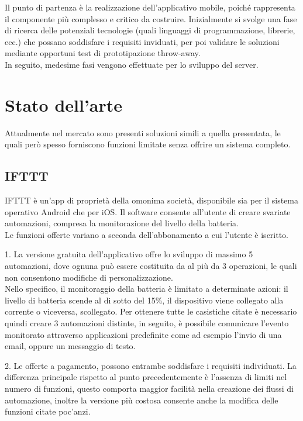 \documentclass[target=bach]{thud}
\begin{document}
    Il punto di partenza è la realizzazione dell'applicativo mobile, poiché rappresenta il componente più complesso e critico da costruire. Inizialmente si svolge una fase di ricerca delle potenziali tecnologie (quali linguaggi di programmazione, librerie, ecc.) che possano soddisfare i requisiti inviduati, per poi validare le soluzioni mediante opportuni test di prototipazione throw-away. \\

    In seguito, medesime fasi vengono effettuate per lo sviluppo del server.\\


\chapter{Stato dell'arte}

    Attualmente nel mercato sono presenti soluzioni simili a quella presentata, le quali però spesso forniscono funzioni limitate senza offrire un sistema completo.

    \section{IFTTT}

    IFTTT è un'app di proprietà della omonima società, disponibile sia per il sistema operativo Android che per iOS.
    Il software consente all'utente di creare svariate automazioni, compresa la monitorazione del livello della batteria.\\
    Le funzioni offerte variano a seconda dell'abbonamento a cui l'utente è iscritto.

    1. La versione gratuita dell'applicativo offre lo sviluppo di massimo 5 automazioni, dove ognuna può essere costituita da al più da 3 operazioni, le quali non consentono modifiche di personalizzazione.\\
    Nello specifico, il monitoraggio della batteria è limitato a determinate azioni: il livello di batteria scende al di sotto del 15\%, il dispositivo viene collegato alla corrente o viceversa, scollegato.
    Per ottenere tutte le casistiche citate è necessario quindi creare 3 automazioni distinte, in seguito, è possibile comunicare l'evento monitorato attraverso applicazioni predefinite come ad esempio l'invio di una email, oppure un messaggio di testo.

    2. Le offerte a pagamento, possono entrambe soddisfare i requisiti individuati.
    La differenza principale rispetto al punto precedentemente è l'assenza di limiti nel numero di funzioni, questo comporta maggior facilità nella creazione dei flussi di automazione, inoltre la versione più costosa consente anche la modifica delle funzioni citate poc'anzi.
\end{document}
